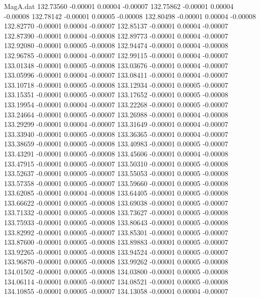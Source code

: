 \begin{filecontents}{MagA.dat}
 132.73560   -0.00001    0.00004   -0.00007
 132.75862   -0.00001    0.00004   -0.00008
 132.78142   -0.00001    0.00005   -0.00008
 132.80498   -0.00001    0.00004   -0.00008
 132.82770   -0.00001    0.00004   -0.00007
 132.85137   -0.00001    0.00004   -0.00007
 132.87390   -0.00001    0.00004   -0.00008
 132.89773   -0.00001    0.00004   -0.00007
 132.92080   -0.00001    0.00005   -0.00008
 132.94474   -0.00001    0.00004   -0.00008
 132.96785   -0.00001    0.00004   -0.00007
 132.99115   -0.00001    0.00004   -0.00007
 133.01348   -0.00001    0.00005   -0.00008
 133.03676   -0.00001    0.00004   -0.00007
 133.05996   -0.00001    0.00004   -0.00007
 133.08411   -0.00001    0.00004   -0.00007
 133.10718   -0.00001    0.00005   -0.00008
 133.12934   -0.00001    0.00005   -0.00007
 133.15351   -0.00001    0.00005   -0.00007
 133.17652   -0.00001    0.00005   -0.00008
 133.19954   -0.00001    0.00004   -0.00007
 133.22268   -0.00001    0.00005   -0.00007
 133.24664   -0.00001    0.00005   -0.00007
 133.26988   -0.00001    0.00004   -0.00008
 133.29299   -0.00001    0.00004   -0.00007
 133.31649   -0.00001    0.00004   -0.00007
 133.33940   -0.00001    0.00005   -0.00008
 133.36365   -0.00001    0.00004   -0.00007
 133.38659   -0.00001    0.00005   -0.00008
 133.40983   -0.00001    0.00005   -0.00007
 133.43291   -0.00001    0.00005   -0.00008
 133.45606   -0.00001    0.00004   -0.00008
 133.47915   -0.00001    0.00005   -0.00007
 133.50310   -0.00001    0.00005   -0.00008
 133.52637   -0.00001    0.00005   -0.00007
 133.55053   -0.00001    0.00005   -0.00008
 133.57358   -0.00001    0.00005   -0.00007
 133.59660   -0.00001    0.00005   -0.00008
 133.62085   -0.00001    0.00004   -0.00008
 133.64405   -0.00001    0.00005   -0.00008
 133.66622   -0.00001    0.00005   -0.00008
 133.69038   -0.00001    0.00005   -0.00007
 133.71332   -0.00001    0.00005   -0.00008
 133.73627   -0.00001    0.00005   -0.00008
 133.75933   -0.00001    0.00005   -0.00008
 133.80643   -0.00001    0.00005   -0.00008
 133.82992   -0.00001    0.00005   -0.00007
 133.85301   -0.00001    0.00005   -0.00007
 133.87600   -0.00001    0.00005   -0.00008
 133.89883   -0.00001    0.00005   -0.00007
 133.92265   -0.00001    0.00005   -0.00008
 133.94524   -0.00001    0.00005   -0.00007
 133.96870   -0.00001    0.00005   -0.00008
 133.99262   -0.00001    0.00005   -0.00008
 134.01502   -0.00001    0.00005   -0.00008
 134.03800   -0.00001    0.00005   -0.00008
 134.06114   -0.00001    0.00005   -0.00007
 134.08521   -0.00001    0.00005   -0.00008
 134.10855   -0.00001    0.00005   -0.00007
 134.13058   -0.00001    0.00004   -0.00007

\end{filecontents}
